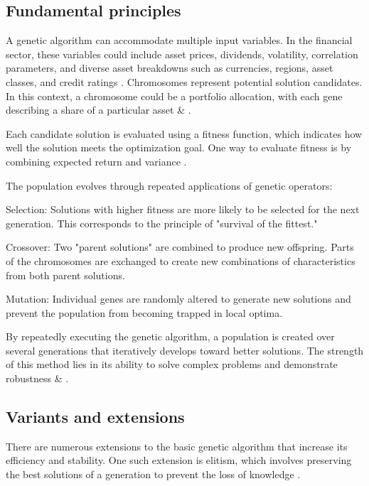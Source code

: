 \documentclass{agasthesis}
\begin{document}
\subsection{Fundamental principles}
A genetic algorithm can accommodate multiple input variables. In the financial sector, these variables could include asset prices, dividends, volatility, 
correlation parameters, and diverse asset breakdowns such as currencies, regions, asset classes, and credit ratings \cite[p. 204]{soldatos_big_2022}. 
Chromosomes represent potential solution candidates. In this context, a chromosome could be a portfolio allocation, 
with each gene describing a share of a particular asset \cite[p. 204]{soldatos_big_2022} & \cite[p. 7]{melanie_introduction_1999}. 

Each candidate solution is evaluated using a fitness function, which indicates how well the solution meets the optimization goal. 
One way to evaluate fitness is by combining expected return and variance \cite[p. 206]{soldatos_big_2022}.

The population evolves through repeated applications of genetic operators:

Selection: Solutions with higher fitness are more likely to be selected for the next generation. 
This corresponds to the principle of "survival of the fittest."

Crossover: Two "parent solutions" are combined to produce new offspring. 
Parts of the chromosomes are exchanged to create new combinations of characteristics from both parent solutions.

Mutation: Individual genes are randomly altered to generate new solutions and prevent the population from becoming trapped in local optima.

\cite[p. 8]{melanie_introduction_1999}

By repeatedly executing the genetic algorithm, a population is created over several generations that iteratively develops toward better solutions. 
The strength of this method lies in its ability to solve complex problems and demonstrate robustness \cite[p. 27]{melanie_introduction_1999} & \cite[p. 213]{soldatos_big_2022}.

\subsection{Variants and extensions}
There are numerous extensions to the basic genetic algorithm that increase its efficiency and stability. 
One such extension is elitism, which involves preserving the best solutions of a generation to prevent the loss of knowledge \cite{deb_fast_2002}.
\end{document}
